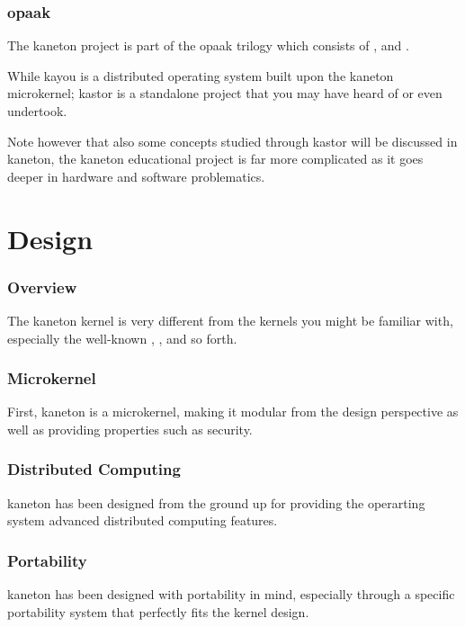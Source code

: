 
\begin{frame}
  \frametitle{opaak}

  The kaneton project is part of the opaak trilogy which consists
  of ,  and .

  \-

  While kayou is a distributed operating system built upon the kaneton
  microkernel; kastor is a standalone project that you may have heard of
  or even undertook.

  \-

  Note however that also some concepts studied through kastor will be
  discussed in kaneton, the kaneton educational project is far more
  complicated as it goes deeper in hardware and software problematics.
\end{frame}

%
%

\section{Design}


\begin{frame}
  \frametitle{Overview}

  The kaneton kernel is very different from the kernels you might be
  familiar with, especially the well-known , ,
   and so forth.
\end{frame}


\begin{frame}
  \frametitle{Microkernel}

  First, kaneton is a microkernel, making it modular from the design
  perspective as well as providing properties such as security.
\end{frame}


\begin{frame}
  \frametitle{Distributed Computing}

  kaneton has been designed from the ground up for providing the operarting
  system advanced distributed computing features.
\end{frame}


\begin{frame}
  \frametitle{Portability}

  kaneton has been designed with portability in mind, especially through
  a specific portability system that perfectly fits the kernel design.
\end{frame}

